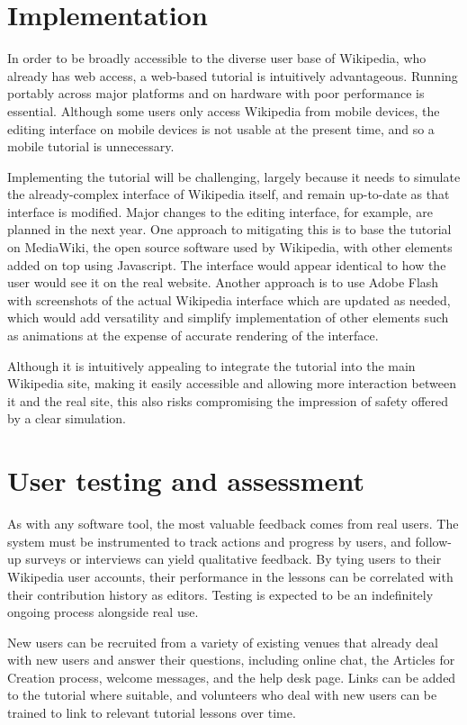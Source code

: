 \documentclass{acm_proc_article-sp}
\begin{document}
\section{Implementation}
In order to be broadly accessible to the diverse user base of Wikipedia, who already has web access, a web-based tutorial is intuitively advantageous. Running portably across major platforms and on hardware with poor performance is essential. Although some users only access Wikipedia from mobile devices, the editing interface on mobile devices is not usable at the present time, and so a mobile tutorial is unnecessary.

Implementing the tutorial will be challenging, largely because it needs to simulate the already-complex interface of Wikipedia itself, and remain up-to-date as that interface is modified. Major changes to the editing interface, for example,  are planned in the next year. One approach to mitigating this is to base the tutorial on MediaWiki, the open source software used by Wikipedia, with other elements added on top using Javascript. The interface would appear identical to how the user would see it on the real website. Another approach is to use Adobe Flash with screenshots of the actual Wikipedia interface which are updated as needed, which would add versatility and simplify implementation of other elements such as animations at the expense of accurate rendering of the interface.

Although it is intuitively appealing to integrate the tutorial into the main Wikipedia site, making it easily accessible and allowing more interaction between it and the real site, this also risks compromising the impression of safety offered by a clear simulation.

\section{User testing and assessment}
As with any software tool, the most valuable feedback comes from real users. The system must be instrumented to track actions and progress by users, and follow-up surveys or interviews can yield qualitative feedback. By tying users to their Wikipedia user accounts, their performance in the lessons can be correlated with their contribution history as editors. Testing is expected to be an indefinitely ongoing process alongside real use.

New users can be recruited from a variety of existing venues that already deal with new users and answer their questions, including online chat, the Articles for Creation process, welcome messages, and the help desk page. Links can be added to the tutorial where suitable, and volunteers who deal with new users can be trained to link to relevant tutorial lessons over time.
\end{document}
